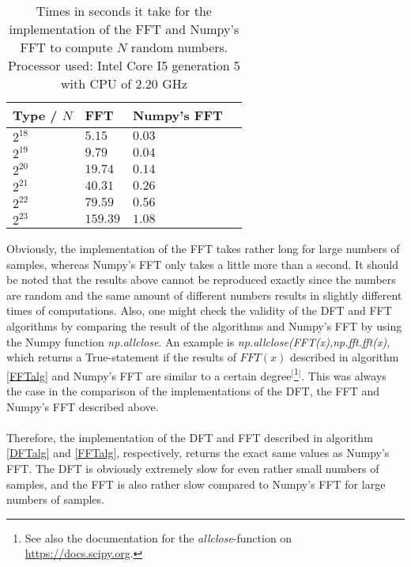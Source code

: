 \begin{table}[H]
\centering
\begin{tabular}{|l|l|l|l|}
\hline
Type / $N$ & FFT	   & Numpy's FFT \\ \hline
$2^{18}$   & $5.15$    & $0.03$ \\ \hline
$2^{19}$   & $9.79$    & $0.04$ \\ \hline
$2^{20}$   & $19.74$   & $0.14$ \\ \hline
$2^{21}$   & $40.31$   & $0.26$ \\ \hline
$2^{22}$   & $79.59$   & $0.56$ \\ \hline
$2^{23}$   & $159.39$  & $1.08$ \\ \hline
\end{tabular}
\caption{Times in seconds it take for the implementation of the FFT and Numpy's FFT to compute $N$ random numbers. Processor used: Intel Core I5 generation 5 with CPU of 2.20 GHz}
\label{tab:FT2compare}
\end{table}

Obviously, the implementation of the FFT takes rather long for large numbers of samples, whereas Numpy's FFT only takes a little more than a second. It should be noted that the results above cannot be reproduced exactly since the numbers are random and the same amount of different numbers results in slightly different times of computations. Also, one might check the validity of the DFT and FFT algorithms by comparing the result of the algorithms and Numpy's FFT by using the Numpy function \textit{np.allclose}. An example is \textit{np.allclose(FFT(x),np.fft.fft(x)}, which returns a True-statement if the results of $FFT(x)$ described in algorithm \ref{FFTalg} and Numpy's FFT are similar to a certain degree$^[$\footnote{See also the documentation for the \textit{allclose}-function on \href{https://docs.scipy.org/doc/numpy/reference/generated/numpy.allclose.html}{https://docs.scipy.org}.}$^]$. This was always the case in the comparison of the implementations of the DFT, the FFT and Numpy's FFT described above.
\\ \\
Therefore, the implementation of the DFT and FFT described in algorithm \ref{DFTalg} and \ref{FFTalg}, respectively, returns the exact same values as Numpy's FFT. The DFT is obviously extremely slow for even rather small numbers of samples, and the FFT is also rather slow compared to Numpy's FFT for large numbers of samples.
